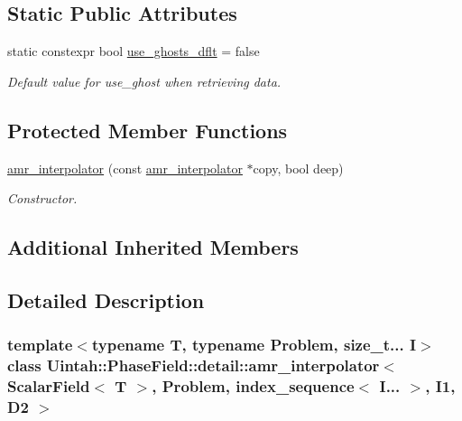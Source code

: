 \subsection*{Static Public Attributes}
\begin{DoxyCompactItemize}
\item 
static constexpr bool \hyperlink{classUintah_1_1PhaseField_1_1detail_1_1amr__interpolator_3_01ScalarField_3_01T_01_4_00_01Problemd2db9de1754b5450c93c191a9275f5ed_a05a1e360547dde624240ae943f6ced4b}{use\+\_\+ghosts\+\_\+dflt} = false
\begin{DoxyCompactList}\small\item\em Default value for use\+\_\+ghost when retrieving data. \end{DoxyCompactList}\end{DoxyCompactItemize}
\subsection*{Protected Member Functions}
\begin{DoxyCompactItemize}
\item 
\hyperlink{classUintah_1_1PhaseField_1_1detail_1_1amr__interpolator_3_01ScalarField_3_01T_01_4_00_01Problemd2db9de1754b5450c93c191a9275f5ed_a5f8bf03fb74a723290420d7aaabe31d2}{amr\+\_\+interpolator} (const \hyperlink{classUintah_1_1PhaseField_1_1detail_1_1amr__interpolator}{amr\+\_\+interpolator} $\ast$copy, bool deep)
\begin{DoxyCompactList}\small\item\em Constructor. \end{DoxyCompactList}\end{DoxyCompactItemize}
\subsection*{Additional Inherited Members}


\subsection{Detailed Description}
\subsubsection*{template$<$typename T, typename Problem, size\+\_\+t... I$>$\newline
class Uintah\+::\+Phase\+Field\+::detail\+::amr\+\_\+interpolator$<$ Scalar\+Field$<$ T $>$, Problem, index\+\_\+sequence$<$ I... $>$, I1, D2 $>$}

